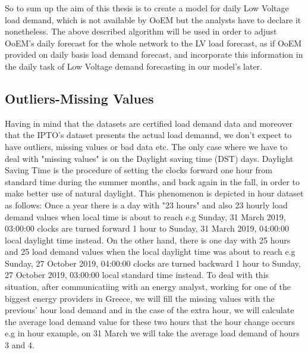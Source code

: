 \par So to sum up the aim of this thesis is to create a model for daily Low Voltage load demand, which is not available by OoEM but the analysts have to declare it nonetheless. The above described algorithm will be used in order to adjust OoEM's daily forecast for the whole network to the LV load forecast, as if OoEM provided on daily basis load demand forecast, and incorporate this information in the daily task of Low Voltage demand forecasting in our model's later.
\subsection{Outliers-Missing Values}
Having in mind that the datasets are certified load demand data and moreover that the IPTO's dataset presents the actual load demannd, we don't expect to have outliers, missing values or bad data  etc. The only case where we have to deal with "missing values" is on the Daylight saving time (DST) days. Daylight Saving Time is the procedure of setting the clocks forward one hour from standard time during the summer months, and back again in the fall, in order to make better use of natural daylight. This phenomenon is depicted in hour dataset as follows: Once a year there is a day with "23 hours" and also 23 hourly load demand values when local time is about to reach e.g Sunday, 31 March 2019, 03:00:00 clocks are turned forward 1 hour to
Sunday, 31 March 2019, 04:00:00 local daylight time instead. On the other hand, there is one day with 25 hours and 25 load demand values when the local daylight time was about to reach e.g Sunday, 27 October 2019, 04:00:00 clocks are turned backward 1 hour to Sunday, 27 October 2019, 03:00:00 local standard time instead. To deal with this situation, after communicatiing with an energy analyst, working for one of the biggest energy providers in Greece, we will fill the missing values with the previous' hour load demand and in the case of the extra hour, we will calculate the average load demand value for these two hours that the hour change occurs e.g in hour example, on 31 March we will take the average load demand of hours 3 and 4.
